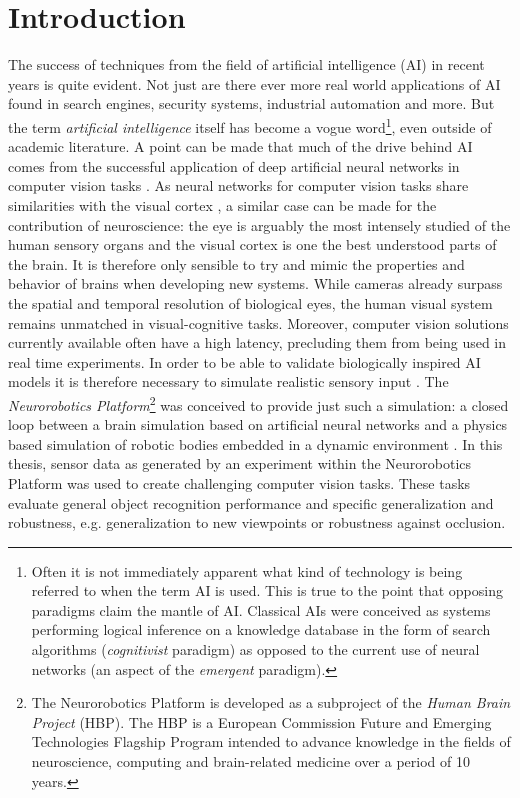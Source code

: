 \chapter{Introduction}\label{chapter:introduction}
The success of techniques from the field of artificial intelligence (AI) in recent years is quite evident. Not just are there ever more real world applications of AI found in search engines, security systems, industrial automation and more. But the term \emph{artificial intelligence} itself has become a vogue word\footnote{Often it is not immediately apparent what kind of technology is being referred to when the term AI is used. This is true to the point that opposing paradigms claim the mantle of AI. Classical AIs were conceived as systems performing logical inference on a knowledge database in the form of search algorithms (\emph{cognitivist} paradigm) as opposed to the current use of neural networks (an aspect of the \emph{emergent} paradigm).}, even outside of academic literature. A point can be made that much of the drive behind AI comes from the successful application of deep artificial neural networks in computer vision tasks \cite{paulun2018retinotopic}. As neural networks for computer vision tasks share similarities with the visual cortex \cite{lecun1998gradient}, a similar case can be made for the contribution of neuroscience: the eye is arguably the most intensely studied of the human sensory organs and the visual cortex is one the best understood parts of the brain. It is therefore only sensible to try and mimic the properties and behavior of brains when developing new systems. While cameras already surpass the spatial and temporal resolution of biological eyes, the human visual system remains unmatched in visual-cognitive tasks. Moreover, computer vision solutions currently available often have a high latency, precluding them from being used in real time experiments. In order to be able to validate biologically inspired AI models it is therefore necessary to simulate realistic sensory input \cite{falotico2017connecting}. The \emph{Neurorobotics Platform}\footnote{The Neurorobotics Platform is developed as a subproject of the \emph{Human Brain Project} (HBP). The HBP is a European Commission Future and Emerging Technologies Flagship Program intended to advance knowledge in the fields of neuroscience, computing and brain-related medicine over a period of 10 years.} was conceived to provide just such a simulation: a closed loop between a brain simulation based on artificial neural networks and a physics based simulation of robotic bodies embedded in a dynamic environment \cite{knoll2017neurorobotics}. In this thesis, sensor data as generated by an experiment within the Neurorobotics Platform was used to create challenging computer vision tasks. These tasks evaluate general object recognition performance and specific generalization and robustness, e.g. generalization to new viewpoints or robustness against occlusion.
